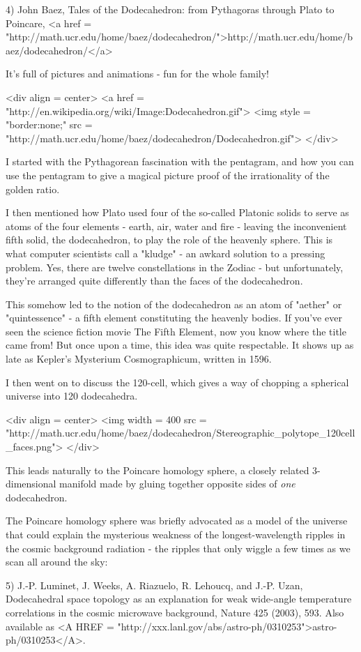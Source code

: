 4) John Baez, Tales of the Dodecahedron: from Pythagoras through Plato
to Poincare, <a href = "http://math.ucr.edu/home/baez/dodecahedron/">http://math.ucr.edu/home/baez/dodecahedron/</a>

It's full of pictures and animations - fun for the whole family!

<div align = center>
<a href = "http://en.wikipedia.org/wiki/Image:Dodecahedron.gif">
<img style = "border:none;" src = "http://math.ucr.edu/home/baez/dodecahedron/Dodecahedron.gif">
</div>

I started with the Pythagorean fascination with the pentagram, and how
you can use the pentagram to give a magical picture proof of the
irrationality of the golden ratio.

I then mentioned how Plato used four of the so-called Platonic solids 
to serve as atoms of the four elements - earth, air, water and fire - 
leaving the inconvenient fifth solid, the dodecahedron, to play the
role of the heavenly sphere.  This is what computer scientists call
a "kludge" - an awkard solution to a pressing problem.  Yes, there 
are twelve constellations in the Zodiac - but unfortunately, they're 
arranged quite differently than the faces of the dodecahedron.

This somehow led to the notion of the dodecahedron as an atom of
"aether" or "quintessence" - a fifth element
constituting the heavenly bodies.  If you've ever seen the science
fiction movie The Fifth Element, now you know where the
title came from!  But once upon a time, this idea was quite
respectable.  It shows up as late as Kepler's Mysterium
Cosmographicum, written in 1596.

I then went on to discuss the 120-cell, which gives a way of chopping 
a spherical universe into 120 dodecahedra. 

<div align = center>
<img width = 400 src = "http://math.ucr.edu/home/baez/dodecahedron/Stereographic_polytope_120cell_faces.png">
</div>

This leads naturally to
the Poincare homology sphere, a closely related 3-dimensional manifold 
made by gluing together opposite sides of \emph{one} dodecahedron.  

The Poincare homology sphere was briefly advocated as a model
of the universe that could explain the mysterious weakness of the 
longest-wavelength ripples in the cosmic background radiation -
the ripples that only wiggle a few times as we scan all around the
sky:

5) J.-P. Luminet, J. Weeks, A. Riazuelo, R. Lehoucq, and J.-P.  Uzan,
Dodecahedral space topology as an explanation for weak wide-angle
temperature correlations in the cosmic microwave background, Nature
425 (2003), 593.  Also available as <A HREF =
"http://xxx.lanl.gov/abs/astro-ph/0310253">astro-ph/0310253</A>.

